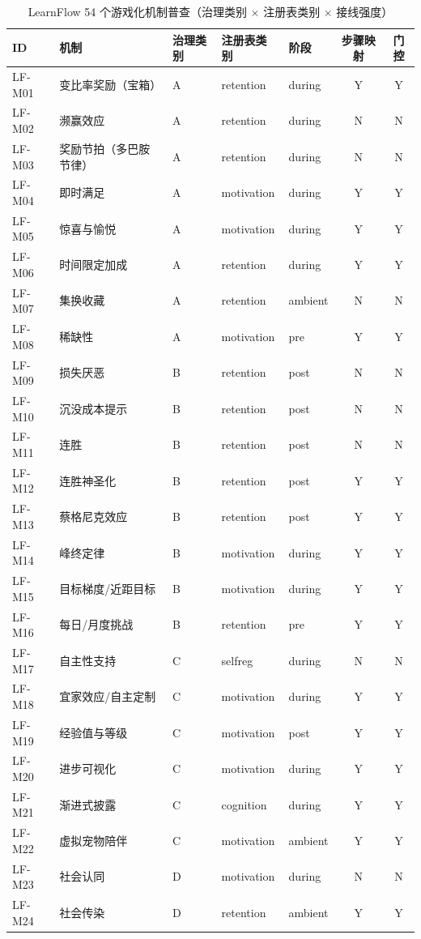 \begin{table}[htbp]
\centering
\caption{LearnFlow 54 个游戏化机制普查（治理类别 × 注册表类别 × 接线强度）}
\label{tab:m2-census}
\small
\begin{tabular}{lllllcc}
\toprule
ID & 机制 & 治理类别 & 注册表类别 & 阶段 & 步骤映射 & 门控 \\
\midrule
LF-M01 & 变比率奖励（宝箱） & A & retention & during & Y & Y \\
LF-M02 & 濒赢效应 & A & retention & during & N & N \\
LF-M03 & 奖励节拍（多巴胺节律） & A & retention & during & N & N \\
LF-M04 & 即时满足 & A & motivation & during & Y & Y \\
LF-M05 & 惊喜与愉悦 & A & motivation & during & Y & Y \\
LF-M06 & 时间限定加成 & A & retention & during & Y & Y \\
LF-M07 & 集换收藏 & A & retention & ambient & N & N \\
LF-M08 & 稀缺性 & A & motivation & pre & Y & Y \\
LF-M09 & 损失厌恶 & B & retention & post & N & N \\
LF-M10 & 沉没成本提示 & B & retention & post & N & N \\
LF-M11 & 连胜 & B & retention & post & N & N \\
LF-M12 & 连胜神圣化 & B & retention & post & Y & Y \\
LF-M13 & 蔡格尼克效应 & B & retention & post & Y & Y \\
LF-M14 & 峰终定律 & B & motivation & during & Y & Y \\
LF-M15 & 目标梯度/近距目标 & B & motivation & during & Y & Y \\
LF-M16 & 每日/月度挑战 & B & retention & pre & Y & Y \\
LF-M17 & 自主性支持 & C & selfreg & during & N & N \\
LF-M18 & 宜家效应/自主定制 & C & motivation & during & Y & Y \\
LF-M19 & 经验值与等级 & C & motivation & post & Y & Y \\
LF-M20 & 进步可视化 & C & motivation & during & Y & Y \\
LF-M21 & 渐进式披露 & C & cognition & during & Y & Y \\
LF-M22 & 虚拟宠物陪伴 & C & motivation & ambient & Y & Y \\
LF-M23 & 社会认同 & D & motivation & during & N & N \\
LF-M24 & 社会传染 & D & retention & ambient & Y & Y \\

\end{tabular}
\end{table}

